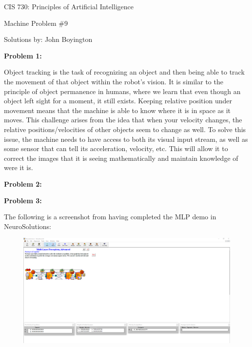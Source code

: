 \documentclass{amsart}
\theoremstyle{definition}
\begin{document}
\LARGE{CIS 730: Principles of Artificial Intelligence}
 
\large
Machine Problem \#9
 
Solutions by: John Boyington
\newline
\bigskip



\textbf{Problem 1:}
\bigbreak

Object tracking is the task of recognizing an object and then being able to track the movement of that object within the robot's vision.
It is similar to the principle of object permanence in humans, where we learn that even though an object left sight for a moment, it still exists.
Keeping relative position under movement means that the machine is able to know where it is in space as it moves.
This challenge arises from the idea that when your velocity changes, the relative positions/velocities of other objects seem to change as well.
To solve this issue, the machine needs to have access to both its visual input stream, as well as some sensor that can tell its acceleration, velocity, etc.
This will allow it to correct the images that it is seeing mathematically and maintain knowledge of were it is.


\bigbreak
\textbf{Problem 2:}
\bigbreak





\bigbreak
\textbf{Problem 3:}
\bigbreak

The following is a screenshot from having completed the MLP demo in NeuroSolutions:

\begin{figure}[h!]
    \includegraphics[width=0.9\linewidth]{mp9-3_0}
\end{figure}
\end{document}
